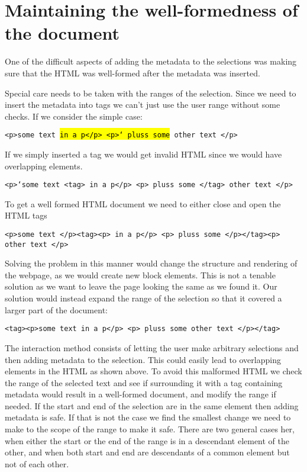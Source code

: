 
\section{Maintaining the well-formedness of the document}
One of the difficult aspects of adding the metadata to the selections was making sure that the HTML was well-formed
after the metadata was inserted.

Special care needs to be taken with the ranges of the selection.
Since we need to insert the metadata into tags we can't just use the user range without some checks.
If we consider the simple case:

\texttt{<p>some text \hl{in a p</p> <p>` pluss some} other text </p>}

If we simply inserted a tag we would get invalid HTML since we would have overlapping elements.

\texttt{<p>`some text <tag> in a p</p> <p> pluss some </tag>  other text </p>}

To get a well formed HTML document we need to either close and open the HTML tags

\texttt{<p>some text </p><tag><p> in a p</p> <p> pluss some </p></tag><p>  other text </p>}

Solving the problem in this manner would change the structure and rendering of the webpage,
as we would create new block elements.
This is not a tenable solution as we want to leave the page looking the same as we found it.
Our solution would instead expand the range of the selection so that it covered a larger part of the document:

\texttt{<tag><p>some text in a p</p> <p> pluss some other text </p></tag>}

The interaction method consists of letting the user make arbitrary selections and then adding metadata to the selection.
This could easily lead to overlapping elements in the HTML as shown above.
To avoid this malformed HTML we check the range of the selected text and see if surrounding it with a tag
containing metadata would result in a well-formed document, and modify the range if needed.
If the start and end of the selection are in the same element then adding metadata is safe.
If that is not the case we find the smallest change we need to make to the scope of the range to make it safe.
There are two general cases her, when either the start or the end of the range is in a descendant element of the other,
and when both start and end are descendants of a common element but not of each other.

